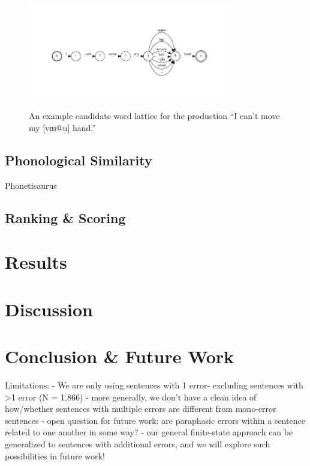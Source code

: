 \begin{figure}[t]
\centering
\includegraphics[width=3.5in]{lattice.pdf}
\label{fig:sample_lattice}
\caption{An example candidate word lattice for the production ``I can't move my [vɑɪ@u] hand.''}
\end{figure}


\subsection{Phonological Similarity} %
\label{sub:phonological_similarity}

Phonetisaurus \cite{Novak:2011aa}


\subsection{Ranking \& Scoring} %
\label{sub:ranking_scoring}


\section{Results}

\section{Discussion}

\section{Conclusion \& Future Work}

Limitations:
    - We are only using sentences with 1 error- excluding sentences with >1 error (N = 1,866)
    - more generally, we don't have a clean idea of how/whether sentences with multiple errors are different from mono-error sentences
        - open question for future work: are paraphasic errors within a sentence related to one another in some way?
        - our general finite-state approach can be generalized to sentences with additional errors, and we will explore such possibilities in future work!


